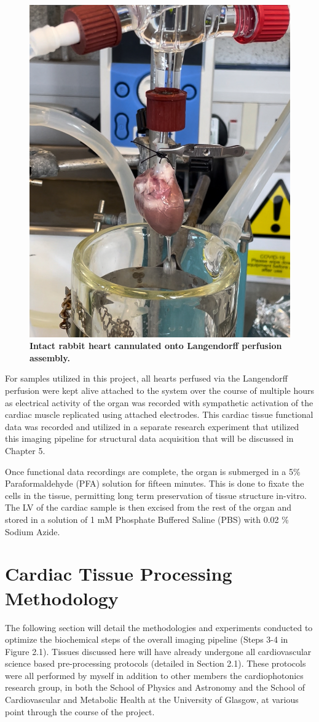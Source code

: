 \begin{figure}[ht]
    \centering
    \includegraphics[width=0.5\linewidth]{Figures/Fig2_3.jpeg}
    \caption{\textbf{Intact rabbit heart cannulated onto Langendorff perfusion assembly.}}
    \label{fig:enter-label}
\end{figure}

For samples utilized in this project, all hearts perfused via the Langendorff perfusion were kept alive attached to the system over the course of multiple hours as electrical activity of the organ was recorded with sympathetic activation of the cardiac muscle replicated using attached electrodes. This cardiac tissue functional data was recorded and utilized in a separate research experiment that utilized this imaging pipeline for structural data acquisition that will be discussed in Chapter 5.

Once functional data recordings are complete, the organ is submerged in a 5\% Paraformaldehyde (PFA) solution for fifteen minutes. This is done to fixate the cells in the tissue, permitting long term preservation of tissue structure in-vitro. The LV of the cardiac sample is then excised from the rest of the organ and stored in a solution of 1 mM Phosphate Buffered Saline (PBS) with 0.02 \% Sodium Azide.

\section{Cardiac Tissue Processing Methodology}

The following section will detail the methodologies and experiments conducted to optimize the biochemical steps of the overall imaging pipeline (Steps 3-4 in Figure 2.1). Tissues discussed here will have already undergone all cardiovascular science based pre-processing protocols (detailed in Section 2.1). These protocols were all performed by myself in addition to other members the cardiophotonics research group, in both the School of Physics and Astronomy and the School of Cardiovascular and Metabolic Health at the University of Glasgow, at various point through the course of the project. 

